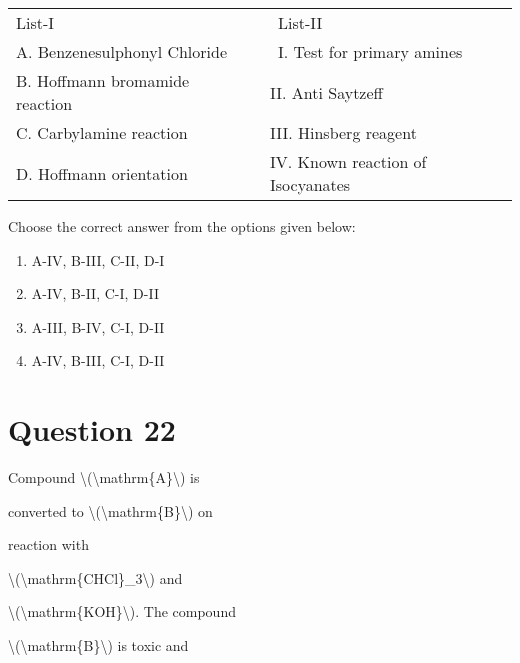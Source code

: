 \documentclass{article}
\begin{document}
\begin{longtable}[]{@{}ll@{}}

\toprule\noalign{}

\endhead

\bottomrule\noalign{}

\endlastfoot

List-I~~ & ~List-II~ \\

A. Benzenesulphonyl Chloride & ~I. Test for primary amines~ \\

B. Hoffmann bromamide reaction~~ & II. Anti Saytzeff~~ \\

C. Carbylamine reaction~ & III. Hinsberg reagent~ \\

D. Hoffmann orientation~ & IV. Known reaction of Isocyanates~ \\

\end{longtable}



Choose the correct answer from the options given below:\\


\begin{enumerate}[label=(\alph*)]
\item A-IV, B-III, C-II, D-I


\item A-IV, B-II, C-I, D-II


\item A-III, B-IV, C-I, D-II


\item A-IV, B-III, C-I, D-II


\end{enumerate}
\newpage
\section*{Question 22}
Compound \textbackslash(\textbackslash mathrm\{A\}\textbackslash) is

converted to \textbackslash(\textbackslash mathrm\{B\}\textbackslash) on

reaction with

\textbackslash(\textbackslash mathrm\{CHCl\}\_3\textbackslash) and

\textbackslash(\textbackslash mathrm\{KOH\}\textbackslash). The compound

\textbackslash(\textbackslash mathrm\{B\}\textbackslash) is toxic and
\end{document}

